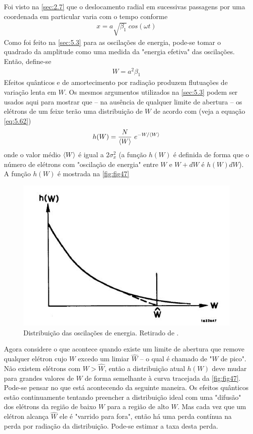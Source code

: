 Foi visto na \autoref{sec:2.7} que o deslocamento radial em sucessivas passagens por uma coordenada em particular varia com o tempo conforme
\begin{align}
	x = a\sqrt{\beta_1}\ cos(\omega t)
\end{align}
Como foi feito na \autoref{sec:5.3} para as oscilações de energia, pode-se tomar o quadrado da amplitude como uma medida da "energia efetiva" das oscilações. Então, define-se
\begin{align}
	W = a^2 \beta_1
\end{align}
Efeitos quânticos e de amortecimento por radiação produzem flutuações de variação lenta em $W$. Os mesmos argumentos utilizados na \autoref{sec:5.3} podem ser usados aqui para mostrar que -- na ausência de qualquer limite de abertura -- os elétrons de um feixe terão uma distribuição de $W$ de acordo com (veja a equação \eqref{eq:5.62})
\begin{align}
	h(W) = \frac{N}{\left< W \right>}\ e^{-W/\left< W \right>}\label{eq:5.120}
\end{align}
onde o valor médio $\left< W \right>$ é igual a $2\sigma_x^2$ (a função $h(W)$ é definida de forma que o número de elétrons com "oscilação de energia" entre $W$ e $W+dW$ é $h(W)dW$). A função $h(W)$ é mostrada na \autoref{fig:fig47}

\begin{figure}[!htb]
	\centering
	\includegraphics[width=0.6\linewidth]{./Figuras/fig47.jpeg}
	\caption{Distribuição das oscilações de energia. Retirado de \cite{sands1970physics}.}
	\label{fig:fig47}
\end{figure}

Agora considere o que acontece quando existe um limite de abertura que remove qualquer elétron cujo $W$ excedo um limiar $\hat{W}$ -- o qual é chamado de "$W$ de pico". Não existem elétrons com $W > \hat{W}$, então a distribuição atual $h(W)$ deve mudar para grandes valores de $W$ de forma semelhante à curva tracejada da \autoref{fig:fig47}. Pode-se pensar no que está acontecendo da seguinte maneira. Os efeitos quânticos estão continuamente tentando preencher a distribuição ideal com uma "difusão" dos elétrons da região de baixo $W$ para a região de alto $W$. Mas cada vez que um elétron alcança $\hat{W}$ ele é "varrido para fora", então há uma perda contínua na perda por radiação da distribuição. Pode-se estimar a taxa desta perda.

